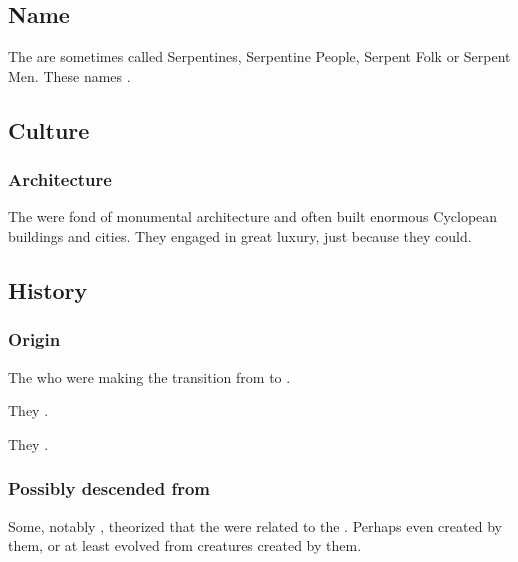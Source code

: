 \subsection{Name}
The \ophidians{} are sometimes called Serpentines, Serpentine People, Serpent Folk or Serpent Men. 
These names . 









\subsection{Culture}





\subsubsection{Architecture}
The \ophidians{} were fond of monumental architecture and often built enormous Cyclopean buildings and cities.
They engaged in great luxury, just because they could. 









\subsection{History}
\subsubsection{Origin}
The \ophidians{}  who were making the transition from  to . 

They . 

They . 





\subsubsection{Possibly descended from \xzaishanns}
Some, notably , theorized that the \ophidians were related to the \xss.
Perhaps even created by them, or at least evolved from creatures created by them.

